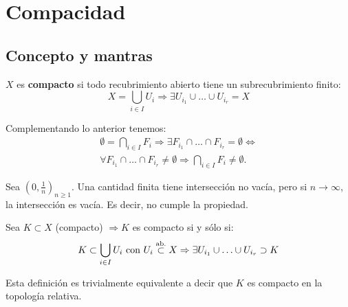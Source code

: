 \chapter{Compacidad}%
\label{cha:compacidad}
\section{Concepto y mantras}%
\label{sec:concepto_y_mantras_comp}
\begin{defi}
$X$ es \textbf{compacto} si todo recubrimiento abierto tiene un subrecubrimiento finito:
\[
X = \bigcup_{i \in  I} U_i \Rightarrow \exists U_{i_1} \cup \ldots \cup U_{i_r} = X
\]
\end{defi}

\begin{obs}
Complementando lo anterior tenemos:
\begin{gather*}
    \emptyset = \bigcap_{i \in I} F_i \Rightarrow \exists F_{i_1} \cap \ldots \cap F_{i_r} = \emptyset \Leftrightarrow\\
    \boxed{\forall F_{i_1} \cap \ldots \cap F_{i_r} \neq \emptyset \Rightarrow \bigcap_{i \in  I} F_i \neq \emptyset}
.\end{gather*}
\end{obs}
\begin{ej}
Sea $\left( 0, \frac{1}{n} \right)_{n \ge 1}$. Una cantidad finita tiene intersección no vacía, pero si $n \rightarrow \infty$, la intersección es vacía.
Es decir, no cumple la propiedad.
\end{ej}

\begin{defi}
Sea $K \subset X$ (compacto) $\Rightarrow K$ es compacto si y sólo si: 
\[
K \subset \bigcup_{i \in  I} U_i \text{ con } U_i \stackrel{\text{ab.}}{\subset} X \Rightarrow \exists U_{i_1} \cup \ldots \cup U_{i_r} \supset K
\]
\end{defi}
\begin{obs}
Esta definición es trivialmente equivalente a decir que $K$ es compacto en la topología relativa.
\end{obs}

